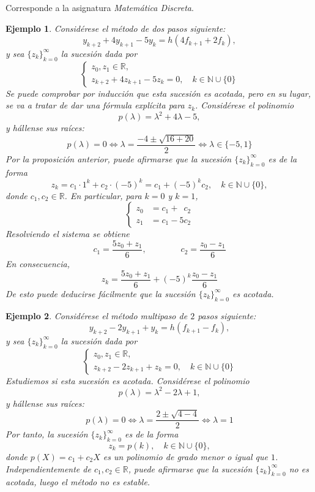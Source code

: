 \documentclass[11pt]{report}
\makeatletter
\renewenvironment{proof}[1][\proofname]{\par
  \pushQED{\qed}%
  \normalfont \topsep\z@skip %
  \trivlist
  \item[\hskip\labelsep
        \itshape
    #1\@addpunct{.}]\ignorespaces
}{%
  \popQED\endtrivlist\@endpefalse
}
\theoremstyle{mytheorem}
\theoremstyle{mydefinition}
\theoremstyle{myexample}
\newtheorem*{example}{Ejemplo}
\let\oldproofname=\proofname
\renewcommand{\proofname}{\rm\bf{\oldproofname}}}
\newcommand{\R}{\mathbb R}
\newcommand{\N}{\mathbb N}
\makeatother
\begin{document}
\begin{proof}
Corresponde a la asignatura \textit{Matemática Discreta}.
\end{proof}

\begin{example}
Considérese el método de dos pasos siguiente:
\[y_{k+2}+4y_{k+1}-5y_k= h(4f_{k+1}+2f_k),\]
y sea $\{z_k\}_{k=0}^\infty$ la sucesión dada por
\[\begin{cases}
    z_0,z_1 \in \R, \\[5pt]
    z_{k+2} +4z_{k+1}-5z_{k}= 0, \quad k \in \N \cup \{0\} 
\end{cases}\]
Se puede comprobar por inducción que esta sucesión es acotada, pero en su lugar, se va a tratar de dar una fórmula explícita para $z_k$. Considérese el polinomio
\[p(\lambda) = \lambda^2+4\lambda-5,\]
y hállense sus raíces:
\[p(\lambda)=0 \iff \lambda = \frac{-4\pm\sqrt{16+20}}{2} \iff \lambda \in \{-5,1\}\]
Por la proposición anterior, puede afirmarse que la sucesión $\{z_k\}_{k=0}^\infty$ es de la forma
\[z_k = c_1\cdot 1^k+c_2 \cdot (-5)^k = c_1+(-5)^kc_2, \quad k \in \N \cup \{0\},\]
donde $c_1, c_2 \in \R$. En particular, para $k = 0$ y $k = 1$,
\[\left\{\begin{alignedat}{1}
    z_0 &= c_1+\phantom{5}c_2 \\
    z_1 &= c_1-5c_2
\end{alignedat}\right.\]
Resolviendo el sistema se obtiene
\[c_1 = \frac{5z_0+z_1}{6}, \qquad \qquad c_2 = \frac{z_0-z_1}{6}\]
En consecuencia,
\[z_k = \frac{5z_0+z_1}{6}+(-5)^k \frac{z_0-z_1}{6}\]
De esto puede deducirse fácilmente que la sucesión $\{z_k\}_{k=0}^\infty$ es acotada.
\end{example}

\begin{example}
Considérese el método multipaso de $2$ pasos siguiente:
\[y_{k+2}-2y_{k+1}+y_k= h(f_{k+1}-f_k),\]
y sea $\{z_k\}_{k=0}^\infty$ la sucesión dada por
\[\begin{cases}
    z_0,z_1 \in \R, \\[5pt]
    z_{k+2} -2z_{k+1}+z_k=0, \quad k \in \N \cup \{0\} 
\end{cases}\]
Estudiemos si esta sucesión es acotada. Considérese el polinomio
\[p(\lambda) = \lambda^2-2\lambda+1,\]
y hállense sus raíces:
\[p(\lambda)=0 \iff \lambda = \frac{2\pm\sqrt{4-4}}{2} \iff \lambda = 1\]
Por tanto, la sucesión $\{z_k\}_{k=0}^\infty$ es de la forma
\[z_k = p(k), \quad k \in \N \cup \{0\},\]
donde $p(X)=c_1+c_2X$ es un polinomio de grado menor o igual que $1$. Independientemente de $c_1,c_2 \in \R$, puede afirmarse que la sucesión $\{z_k\}_{k=0}^\infty$ no es acotada, luego el método no es estable.
\end{example}
\end{document}
